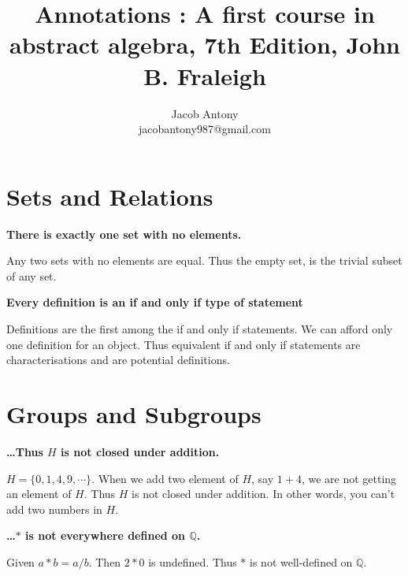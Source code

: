 \documentclass[a4paper,12pt,openany]{book}
\title{Annotations : A first course in\\ abstract algebra, 7th Edition, John B. Fraleigh}
\author{Jacob Antony\\jacobantony987@gmail.com}
\begin{document}
\maketitle
\chapter*{Sets and Relations}
\textbf{\phantom{}}
\textbf{There is exactly one set with no elements.}\\
\begin{story}
	Any two sets with no elements are equal.
	Thus the empty set, is the trivial subset of any set.
\end{story}

\textbf{\phantom{}}
\textbf{Every definition is an if and only if type of statement}\\
\begin{story}
	Definitions are the first among the if and only if statements. We can afford only one definition for an object. Thus equivalent if and only if statements are characterisations and are potential definitions.
\end{story}

\chapter{Groups and Subgroups}
\textbf{\phantom{}}
\textbf{\dots Thus $H$ is not closed under addition.}\\
\begin{story}
	$H = \{ 0,1,4,9,\cdots\}$.
	When we add two element of $H$, say $1+4$, we are not getting an element of $H$.
	Thus $H$ is not closed under addition.
	In other words, you can't add two numbers in $H$.
\end{story}

\textbf{\phantom{}}
\textbf{\dots $\ast$ is not everywhere defined on $\mathbb{Q}$.}\\
\begin{story}
	Given $a \ast b = a/b$. Then $2 \ast 0 $ is undefined.
	Thus $\ast$ is not well-defined on $\mathbb{Q}$.
\end{story}
\end{document}
